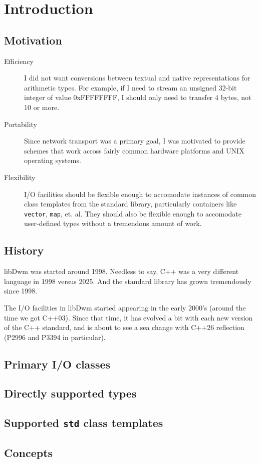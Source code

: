 \chapter{Introduction}

\section{Motivation}
\begin{description}
\item[Efficiency]  I did not want conversions between textual and native
  representations for arithmetic types.  For example, if I need to stream
  an unsigned 32-bit integer of value 0xFFFFFFFF, I should only need to
  transfer 4 bytes, not 10 or more.
\item[Portability]  Since network transport was a primary goal, I was
  motivated to provide schemes that work across fairly common hardware
  platforms and UNIX operating systems.
\item[Flexibility]  I/O facilities should be flexible enough to accomodate
  instances of common class templates from the standard library, particularly
  containers like \texttt{vector}, \texttt{map}, et. al.  They should
  also be flexible enough to accomodate user-defined types without a
  tremendous amount of work.
\end{description}

\section{History}
libDwm was started around 1998.  Needless to say, C++ was a very
different language in 1998 versus 2025.  And the standard library has
grown tremendously since 1998.

The I/O facilities in libDwm started appearing in the early 2000's
(around the time we got C++03).  Since that time, it has evolved a bit
with each new version of the C++ standard, and is about to see a sea
change with C++26 reflection (P2996 and P3394 in particular).

\section{Primary I/O classes}

\section{Directly supported types}

\section{Supported \texttt{std} class templates}

\section{Concepts}
